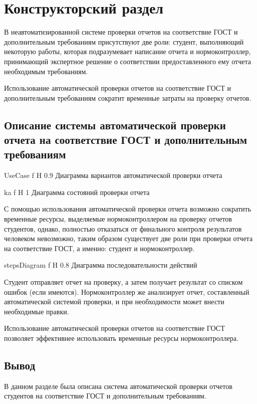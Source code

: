 \chapter{Конструкторский раздел}
В неавтоматизированной системе проверки отчетов на соответствие ГОСТ и дополнительным требованиям присутствуют две роли: студент, выполняющий некоторую работы, которая подразумевает написание отчета и нормоконтроллер, принимающий экспертное решение о соответствии предоставленного ему отчета необходимым требованиям.

Использование автоматической проверки отчетов на соответствие ГОСТ и дополнительным требованиям сократит временные затраты на проверку отчетов.

\section{Описание системы автоматической проверки отчета на соответствие ГОСТ и дополнительным требованиям}

{UseCase} %
{f} %
{H} %
{0.9\textwidth} %
{Диаграмма вариантов автоматической проверки отчета} %

{ka} %
{f} %
{H} %
{1\textwidth} %
{Диаграмма состояний проверки отчета} %

С помощью использования автоматической проверки отчета возможно сократить временные ресурсы, выделяемые нормоконтроллером на проверку отчетов студентов, однако, полностью отказаться от финального контроля результатов человеком невозможно, таким образом существует две роли при проверки отчета на соответствие ГОСТ, а именно: студент и нормоконтроллер.

{stepsDiagram} %
{f} %
{H} %
{0.8\textwidth} %
{Диаграмма последовательности действий} %

Студент отправляет отчет на проверку, а затем получает результат со списком ошибок (если имеются). Нормоконтроллер же анализирует отчет, составленный автоматической системой проверки, и при необходимости может внести необходимые правки.

Использование автоматической проверки отчетов на соответствие ГОСТ позволяет эффективнее использовать временные ресурсы нормоконтроллера.

\section*{Вывод}
В данном разделе была описана система автоматической проверки отчетов студентов на соответствие ГОСТ и дополнительным требованиям.
